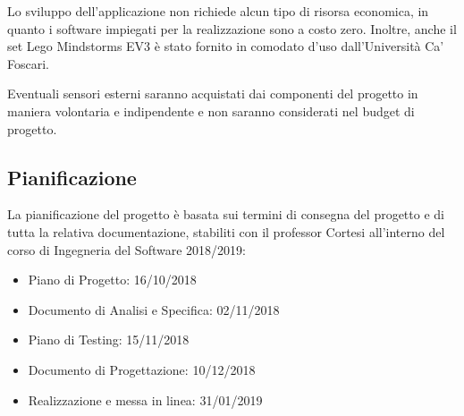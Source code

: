 \documentclass{article}
\begin{document}
  Lo sviluppo dell'applicazione non richiede alcun tipo di risorsa
  economica, in quanto i software impiegati per la realizzazione sono a
  costo zero. Inoltre, anche il set Lego Mindstorms EV3 è stato fornito in
  comodato d'uso dall'Università Ca' Foscari.
  
  Eventuali sensori esterni saranno acquistati dai componenti del progetto
  in maniera volontaria e indipendente e non saranno considerati nel
  budget di progetto.
  
  \subsection{Pianificazione}
  
  La pianificazione del progetto è basata sui termini di consegna del
  progetto e di tutta la relativa documentazione, stabiliti con il
  professor Cortesi all'interno del corso di Ingegneria del Software
  2018/2019:
  \begin{itemize}
  \item Piano di Progetto: 16/10/2018
  \item Documento di Analisi e Specifica: 02/11/2018
  \item Piano di Testing: 15/11/2018
  \item Documento di Progettazione: 10/12/2018
  \item Realizzazione e messa in linea: 31/01/2019
  \end{itemize}
  
  
  
  
\end{document}
